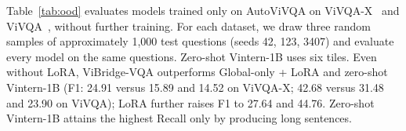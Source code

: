 Table~\ref{tab:ood} evaluates models trained only on AutoViVQA on ViVQA-X~\cite{vivqax2025} and
ViVQA~\cite{tran2021vivqa}, without further training. For each dataset, we draw three random
samples of approximately 1{,}000 test questions (seeds 42, 123, 3407) and evaluate every model on
the same questions. Zero-shot Vintern-1B uses six tiles. Even without LoRA, ViBridge-VQA
outperforms Global-only + LoRA and zero-shot Vintern-1B (F1: 24.91 versus 15.89 and 14.52 on
ViVQA-X; 42.68 versus 31.48 and 23.90 on ViVQA); LoRA further raises F1 to 27.64 and 44.76.
Zero-shot Vintern-1B attains the highest Recall only by producing long sentences.
